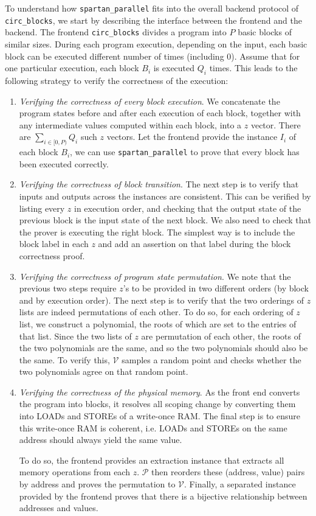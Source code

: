 \documentclass{article}
\newcommand{\code}{\texttt}
\renewcommand{\P}{\mathcal{P}}
\newcommand{\V}{\mathcal{V}}
\begin{document}
To understand how \code{spartan\_parallel} fits into the overall backend protocol of \code{circ\_blocks}, we start by describing the interface between the frontend and the backend. The frontend \code{circ\_blocks} divides a program into $P$ basic blocks of similar sizes. During each program execution, depending on the input, each basic block can be executed different number of times (including 0). Assume that for one particular execution, each block $B_i$ is executed $Q_i$ times. This leads to the following strategy to verify the correctness of the execution:
\begin{enumerate}
    \item \emph{Verifying the correctness of every block execution}. We concatenate the program states before and after each execution of each block, together with any intermediate values computed within each block, into a $z$ vector. There are $\sum_{i\in [0, P)} Q_i$ such $z$ vectors. Let the frontend provide the instance $I_i$ of each block $B_i$, we can use \code{spartan\_parallel} to prove that every block has been executed correctly.
    \item \emph{Verifying the correctness of block transition}. The next step is to verify that inputs and outputs across the instances are consistent. This can be verified by listing every $z$ in execution order, and checking that the output state of the previous block is the input state of the next block. We also need to check that the prover is executing the right block. The simplest way is to include the block label in each $z$ and add an assertion on that label during the block correctness proof.
    \item \emph{Verifying the correctness of program state permutation}. We note that the previous two steps require $z$'s to be provided in two different orders (by block and by execution order). The next step is to verify that the two orderings of $z$ lists are indeed permutations of each other. To do so, for each ordering of $z$ list, we construct a polynomial, the roots of which are set to the entries of that list. Since the two lists of $z$ are permutation of each other, the roots of the two polynomials are the same, and so the two polynomials should also be the same. To verify this, $\V$ samples a random point and checks whether the two polynomials agree on that random point.
    \item \emph{Verifying the correctness of the physical memory}. As the front end converts the program into blocks, it resolves all scoping change by converting them into LOADs and STOREs of a write-once RAM. The final step is to ensure this write-once RAM is coherent, i.e. LOADs and STOREs on the same address should always yield the same value.

    To do so, the frontend provides an extraction instance that extracts all memory operations from each $z$. $\P$ then reorders these (address, value) pairs by address and proves the permutation to $\V$. Finally, a separated instance provided by the frontend proves that there is a bijective relationship between addresses and values.
\end{enumerate}
\end{document}
